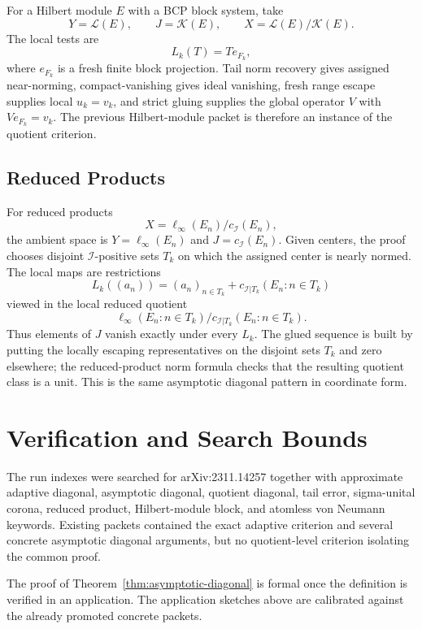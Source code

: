 \documentclass[11pt]{article}
\newcommand{\cI}{\mathcal I}
\begin{document}
For a Hilbert module \(E\) with a BCP block system, take
\[
        Y=\mathcal L(E),\qquad J=\mathcal K(E),\qquad
        X=\mathcal L(E)/\mathcal K(E).
\]
The local tests are
\[
        L_k(T)=Te_{F_k},
\]
where \(e_{F_k}\) is a fresh finite block projection.  Tail norm recovery
gives assigned near-norming, compact-vanishing gives ideal vanishing, fresh
range escape supplies local \(u_k=v_k\), and strict gluing supplies the global
operator \(V\) with \(Ve_{F_k}=v_k\).  The previous Hilbert-module packet is
therefore an instance of the quotient criterion.

\subsection*{Reduced Products}

For reduced products
\[
        X=\ell_\infty(E_n)/c_\cI(E_n),
\]
the ambient space is \(Y=\ell_\infty(E_n)\) and \(J=c_\cI(E_n)\).  Given
centers, the proof chooses disjoint \(\cI\)-positive sets \(T_k\) on which
the assigned center is nearly normed.  The local maps are restrictions
\[
        L_k((a_n))
        =
        (a_n)_{n\in T_k}
        +c_{\cI|T_k}(E_n:n\in T_k)
\]
viewed in the local reduced quotient
\[
        \ell_\infty(E_n:n\in T_k)/c_{\cI|T_k}(E_n:n\in T_k).
\]
Thus elements of \(J\) vanish exactly under every \(L_k\).  The glued
sequence is built by putting the locally escaping representatives on the
disjoint sets \(T_k\) and zero elsewhere; the reduced-product norm formula
checks that the resulting quotient class is a unit.  This is the same
asymptotic diagonal pattern in coordinate form.

\section*{Verification and Search Bounds}

The run indexes were searched for arXiv:2311.14257 together with approximate
adaptive diagonal, asymptotic diagonal, quotient diagonal, tail error,
sigma-unital corona, reduced product, Hilbert-module block, and atomless von
Neumann keywords.  Existing packets contained the exact adaptive criterion
and several concrete asymptotic diagonal arguments, but no quotient-level
criterion isolating the common proof.

The proof of Theorem~\ref{thm:asymptotic-diagonal} is formal once the
definition is verified in an application.  The application sketches above are
calibrated against the already promoted concrete packets.
\end{document}
